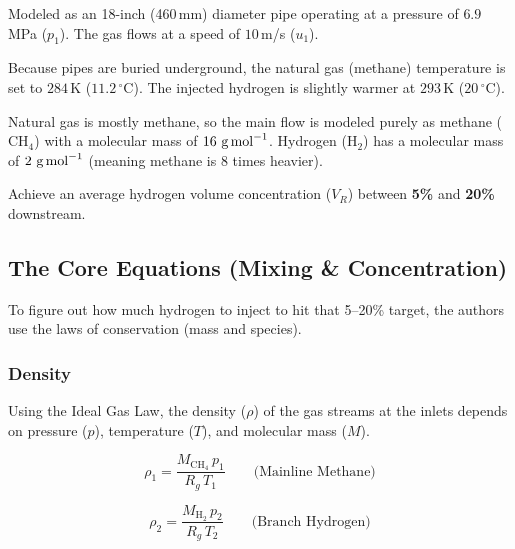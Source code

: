 \documentclass[12pt,a4paper]{report}
\begin{document}
\begin{description}[style=nextline, font=\normalfont\bfseries, leftmargin=1.5em]

  \item[The Main Pipe (Natural Gas):]
  Modeled as an 18-inch (460\,mm) diameter pipe operating at a pressure of $6.9$\,MPa ($p_1$). The gas flows at a speed of $10$\,m/s ($u_1$).

  \item[Temperatures:]
  Because pipes are buried underground, the natural gas (methane) temperature is set to $284$\,K ($11.2\,^\circ$C). The injected hydrogen is slightly warmer at $293$\,K ($20\,^\circ$C).

  \item[The Gases:]
  Natural gas is mostly methane, so the main flow is modeled purely as methane ($\mathrm{CH_4}$) with a molecular mass of $16\text{ g\,mol}^{-1}$. Hydrogen ($\mathrm{H_2}$) has a molecular mass of $2\text{ g\,mol}^{-1}$ (meaning methane is 8 times heavier).

  \item[The Goal:]
  Achieve an average hydrogen volume concentration ($V_R$) between \textbf{5\%} and \textbf{20\%} downstream.

\end{description}

\subsection{The Core Equations (Mixing \& Concentration)}

To figure out how much hydrogen to inject to hit that 5--20\% target, the authors use the laws of conservation (mass and species).

\subsubsection*{Density}

Using the Ideal Gas Law, the density ($\rho$) of the gas streams at the inlets depends on pressure ($p$), temperature ($T$), and molecular mass ($M$).

\begin{equation}
  \rho_1 = \frac{M_{\mathrm{CH_4}}\, p_1}{R_g\, T_1}
  \qquad \text{(Mainline Methane)}
\end{equation}

\begin{equation}
  \rho_2 = \frac{M_{\mathrm{H_2}}\, p_2}{R_g\, T_2}
  \qquad \text{(Branch Hydrogen)}
\end{equation}
\end{document}
